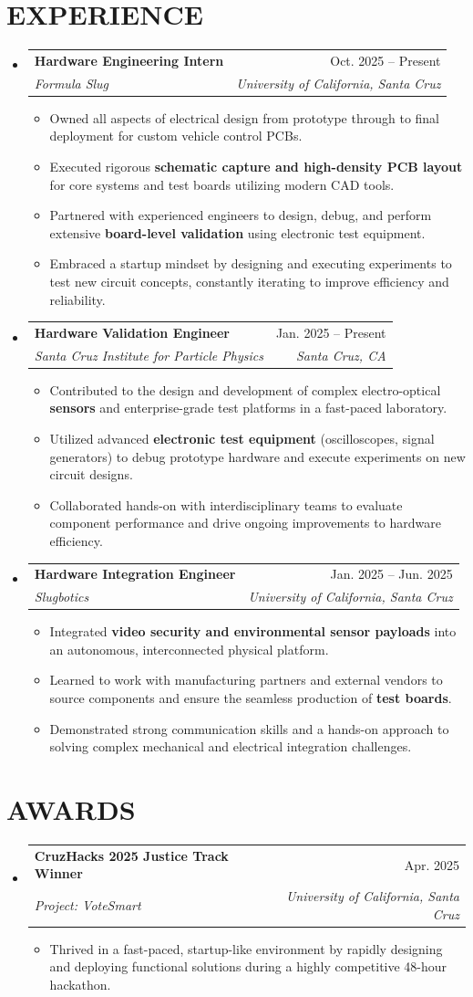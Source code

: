 \documentclass[letterpaper,11pt]{article}
\makeatletter
\newcommand{\resumeItem}[1]{
  \item\small{
    {#1 \vspace{-2pt}}
  }
}
\newcommand{\resumeSubheading}[4]{
  \vspace{-2pt}\item
    \begin{tabular*}{0.97\textwidth}[t]{l@{\extracolsep{\fill}}r}
      \textbf{#1} & #2 \\
      \textit{\small#3} & \textit{\small #4} \\
    \end{tabular*}\vspace{-7pt}
}
\newcommand{\resumeSubHeadingListStart}{\begin{itemize}[leftmargin=0.15in, label={}]}
\newcommand{\resumeSubHeadingListEnd}{\end{itemize}}
\newcommand{\resumeItemListStart}{\begin{itemize}}
\newcommand{\resumeItemListEnd}{\end{itemize}\vspace{-5pt}}
\makeatother
\begin{document}
\section{EXPERIENCE}
  \resumeSubHeadingListStart
    \resumeSubheading
      {Hardware Engineering Intern}{Oct. 2025 -- Present}
      {Formula Slug}{University of California, Santa Cruz}
      \resumeItemListStart
        \resumeItem{Owned all aspects of electrical design from prototype through to final deployment for custom vehicle control PCBs.}
        \resumeItem{Executed rigorous \textbf{schematic capture and high-density PCB layout} for core systems and test boards utilizing modern CAD tools.}
        \resumeItem{Partnered with experienced engineers to design, debug, and perform extensive \textbf{board-level validation} using electronic test equipment.}
        \resumeItem{Embraced a startup mindset by designing and executing experiments to test new circuit concepts, constantly iterating to improve efficiency and reliability.}
      \resumeItemListEnd
    \resumeSubheading
      {Hardware Validation Engineer}{Jan. 2025 -- Present}
      {Santa Cruz Institute for Particle Physics}{Santa Cruz, CA}
      \resumeItemListStart
        \resumeItem{Contributed to the design and development of complex electro-optical \textbf{sensors} and enterprise-grade test platforms in a fast-paced laboratory.}
        \resumeItem{Utilized advanced \textbf{electronic test equipment} (oscilloscopes, signal generators) to debug prototype hardware and execute experiments on new circuit designs.}
        \resumeItem{Collaborated hands-on with interdisciplinary teams to evaluate component performance and drive ongoing improvements to hardware efficiency.}
      \resumeItemListEnd
    \resumeSubheading
      {Hardware Integration Engineer}{Jan. 2025 -- Jun. 2025}
      {Slugbotics}{University of California, Santa Cruz}
      \resumeItemListStart
        \resumeItem{Integrated \textbf{video security and environmental sensor payloads} into an autonomous, interconnected physical platform.}
        \resumeItem{Learned to work with manufacturing partners and external vendors to source components and ensure the seamless production of \textbf{test boards}.}
        \resumeItem{Demonstrated strong communication skills and a hands-on approach to solving complex mechanical and electrical integration challenges.}
      \resumeItemListEnd
  \resumeSubHeadingListEnd


\section{AWARDS}
  \resumeSubHeadingListStart
    \resumeSubheading
      {CruzHacks 2025 Justice Track Winner}{Apr. 2025}
      {Project: VoteSmart}{University of California, Santa Cruz}
      \resumeItemListStart
        \resumeItem{Thrived in a fast-paced, startup-like environment by rapidly designing and deploying functional solutions during a highly competitive 48-hour hackathon.}
      \resumeItemListEnd
  \resumeSubHeadingListEnd
\end{document}
